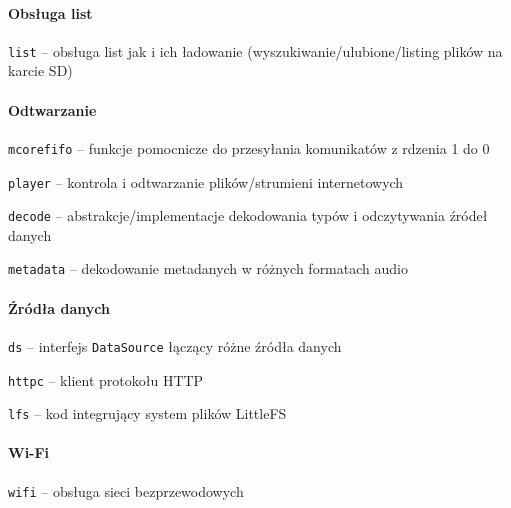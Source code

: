 \documentclass[12pt]{report}
\let\tempone\itemize
\let\temptwo\enditemize
\renewenvironment{itemize}{\tempone\setlength{\itemsep}{0cm}}{\temptwo}
\begin{document}
			\paragraph{Obsługa list}
				\begin{itemize}
					\item \lstinline|list| -- obsługa list jak i ich ładowanie (wyszukiwanie/ulubione/listing plików na karcie SD)
				\end{itemize}
			
			\paragraph{Odtwarzanie}
				\begin{itemize}
					\item \lstinline|mcorefifo| -- funkcje pomocnicze do przesyłania komunikatów z rdzenia 1 do 0
					\item \lstinline|player| -- kontrola i odtwarzanie plików/strumieni internetowych
					\begin{itemize}
						\item \lstinline|decode| -- abstrakcje/implementacje dekodowania typów i odczytywania źródeł danych
						\item \lstinline|metadata| -- dekodowanie metadanych w różnych formatach audio
					\end{itemize}
				\end{itemize}
		
			\paragraph{Źródła danych}
				\begin{itemize}
					\item \lstinline|ds| -- interfejs \lstinline|DataSource| łączący różne źródła danych
					\item \lstinline|httpc| -- klient protokołu HTTP
					\item \lstinline|lfs| -- kod integrujący system plików LittleFS\textsuperscript{\cite{littlefs}}
				\end{itemize}
			
			\paragraph{Wi-Fi}
				\begin{itemize}
					\item \lstinline|wifi| -- obsługa sieci bezprzewodowych
				\end{itemize}
		
\end{document}
